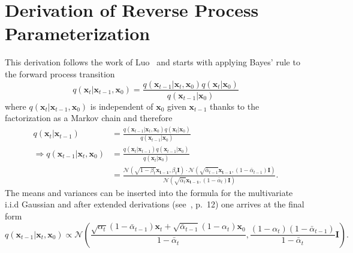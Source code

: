 \section{Derivation of Reverse Process Parameterization}
This derivation follows the work of Luo~\autocite{luo2022understanding} and starts with applying Bayes' rule to the forward process transition
\begin{equation}
    q(\bm{x}_t|\bm{x}_{t-1}, \bm{x}_0) = \frac{q(\bm{x}_{t-1}|\bm{x}_{t},\bm{x}_{0})q(\bm{x}_{t}|\bm{x}_{0})}{q(\bm{x}_{t-1}|\bm{x}_{0})}
\end{equation}
where $q(\bm{x}_t|\bm{x}_{t-1},\bm{x}_{0})$ is independent of $\bm{x}_0$ given $\bm{x}_{t-1}$ thanks to the factorization as a Markov chain and therefore
\begin{align}
    q(\bm{x}_t|\bm{x}_{t-1})                        & = \frac{q(\bm{x}_{t-1}|\bm{x}_{t},\bm{x}_0)q(\bm{x}_{t}|\bm{x}_{0})}{q(\bm{x}_{t-1}|\bm{x}_{0})}                                                                                                                                           \\
    \Rightarrow q(\bm{x}_{t-1}|\bm{x}_{t},\bm{x}_0) & = \frac{q(\bm{x}_t|\bm{x}_{t-1})q(\bm{x}_{t-1}|\bm{x}_{0})}{q(\bm{x}_t|\bm{x}_{0})}                                                                                                                                                        \\
                                                    & = \frac{\mathcal{N}(\sqrt{1-\beta_t}\bm{x_{t-1}}, \beta_t \bm{I}) \cdot \mathcal{N}(\sqrt{\bar{\alpha}_{t-1}}\bm{x_{t-1}}, (1-\bar{\alpha}_{t-1}) \bm{I})}{\mathcal{N}(\sqrt{\bar{\alpha}_{t}}\bm{x_{t-1}}, (1-\bar{\alpha}_{t}) \bm{I})}.
\end{align}
The means and variances can be inserted into the formula for the multivariate i.i.d Gaussian and after extended derivations (see~\autocite{luo2022understanding}, p.~12) one arrives at the final form
\begin{equation}
    q(\bm{x}_{t-1}|\bm{x}_{t},\bm{x}_0) \propto \mathcal{N}\left(\frac{\sqrt{\alpha_{t}}\left(1-\bar{\alpha}_{t-1}\right) \bm{x}_{t}+\sqrt{\bar{\alpha}_{t-1}}\left(1-\alpha_{t}\right) \bm{x}_{0}}{1-\bar{\alpha}_{t}}, \frac{\left(1-\alpha_{t}\right)\left(1-\bar{\alpha}_{t-1}\right)}{1-\bar{\alpha}_{t}} \mathbf{I}\right).
\end{equation}

